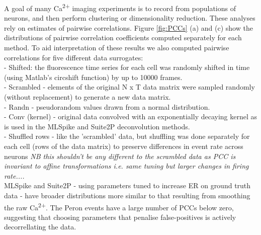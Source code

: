 \documentclass[a4paper]{article}
\begin{document}
A goal of many Ca\textsuperscript{2+} imaging experiments is to record from populations of neurons, and then perform clustering or dimensionality reduction. These analyses rely on estimates of pairwise correlations. Figure \ref{fig:PCCs} (a) and (c) show the distributions of pairwise correlation coefficients computed separately for each method. To aid interpretation of these results we also computed pairwise correlations for five different data surrogates: \\
\indent - Shifted: the fluorescence time series for each cell was randomly shifted in time (using Matlab's circshift function) by up to 10000 frames. \\
\indent - Scrambled - elements of the original N x T data matrix were sampled randomly (without replacement) to generate a new data matrix. \\
\indent - Randn - pseudorandom values drawn from a normal distribution. \\
\indent - Conv (kernel) - original data convolved with an exponentially decaying kernel as is used in the MLSpike and Suite2P deconvolution methods. \\
\indent - Shuffled rows - like the 'scrambled' data, but shuffling was done separately for each cell (rows of the data matrix) to preserve differences in event rate across neurons \emph{NB this shouldn't be any different to the scrambled data as PCC is invariant to affine transformations i.e. same tuning but larger changes in firing rate....}\\

MLSpike and Suite2P - using parameters tuned to increase ER on ground truth data - have broader distributions more similar to that resulting from smoothing the raw Ca\textsuperscript{2+}. The Peron events have a large number of PCCs below zero, suggesting that choosing parameters that penalise false-positives is actively decorrellating the data. 





\end{document}
